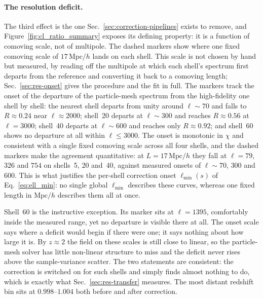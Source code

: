 \documentclass{report}
\begin{document}
\paragraph{The resolution deficit.} The third effect is the one
Sec.~\ref{sec:correction-pipelines} exists to remove, and
Figure~\ref{fig:cl_ratio_summary} exposes its defining property: it is a function
of comoving scale, not of multipole. The dashed markers show where one fixed comoving scale of \mbox{$17\,\mathrm{Mpc}/h$} lands on each shell. This scale is not chosen by hand but measured, by reading off the multipole at which each shell's spectrum first departs from the reference and converting it back to a comoving length; Sec.~\ref{sec:res-onset} gives the procedure and the fit in full. The markers track the onset of the departure of the particle-mesh spectrum from the high-fidelity one shell by shell: the nearest
shell departs from unity around $\ell \sim 70$ and falls to $R \approx 0.24$ near
$\ell \approx 2000$; shell~20 departs at $\ell \sim 300$ and reaches $R \approx
0.56$ at $\ell = 3000$; shell~40 departs at $\ell \sim 600$ and reaches only
$R \approx 0.92$; and shell~60 shows no departure at all within $\ell \le 3000$.
The onset is monotonic in \mbox{$\chi$} and consistent with a single fixed comoving scale across all four shells, and the dashed markers make the agreement quantitative: at \mbox{$L = 17\,\mathrm{Mpc}/h$} they fall at \mbox{$\ell = 79$}, \mbox{$326$} and \mbox{$754$} on shells~5, 20 and~40, against measured onsets of \mbox{$\ell \sim 70$}, \mbox{$300$} and \mbox{$600$}. This is what justifies the per-shell correction onset \mbox{$\ell_{\min}(s)$} of Eq.~\eqref{eq:ell_min}: no single global \mbox{$\ell_{\min}$} describes these curves, whereas one fixed length in \mbox{$\mathrm{Mpc}/h$} describes them all at once.

Shell~60 is the instructive exception. Its marker sits at \mbox{$\ell = 1395$}, comfortably inside the measured range, yet no departure is visible there at all. The onset scale says where a deficit would begin if there were one; it says nothing about how large it is. By \mbox{$z \approx 2$} the field on these scales is still close to linear, so the particle-mesh solver has little non-linear structure to miss and the deficit never rises above the sample-variance scatter. The two statements are consistent: the correction is switched on for such shells and simply finds almost nothing to do, which is exactly what Sec.~\ref{sec:res-transfer} measures. The most distant redshift bin sits at \mbox{$0.998$}--\mbox{$1.004$} both before and after correction.
\end{document}
